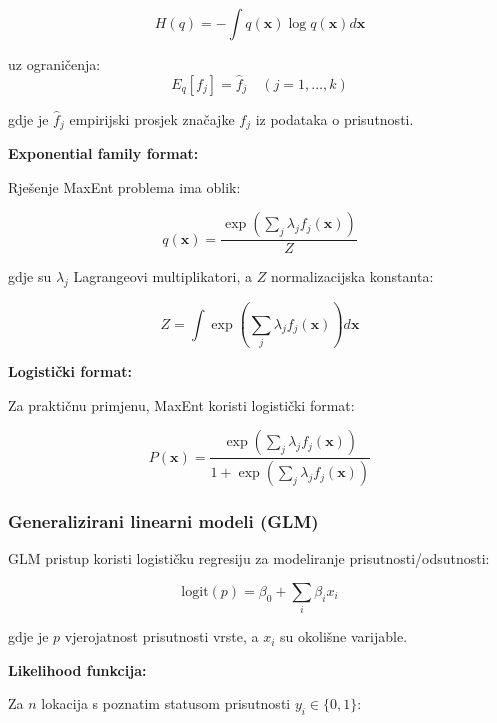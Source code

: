 \documentclass[11pt,oneside]{book}
\begin{document}
\begin{equation}
	H(q) = -\int q(\mathbf{x}) \log q(\mathbf{x}) d\mathbf{x}
\end{equation}

uz ograničenja:
\begin{equation}
	E_q[f_j] = \hat{f}_j \quad (j = 1, \ldots, k)
\end{equation}

gdje je $\hat{f}_j$ empirijski prosjek značajke $f_j$ iz podataka o prisutnosti.

\textbf{Exponential family format:}

Rješenje MaxEnt problema ima oblik:

\begin{equation}
	q(\mathbf{x}) = \frac{\exp\left(\sum_j \lambda_j f_j(\mathbf{x})\right)}{Z}
\end{equation}

gdje su $\lambda_j$ Lagrangeovi multiplikatori, a $Z$ normalizacijska konstanta:

\begin{equation}
	Z = \int \exp\left(\sum_j \lambda_j f_j(\mathbf{x})\right) d\mathbf{x}
\end{equation}

\textbf{Logistički format:}

Za praktičnu primjenu, MaxEnt koristi logistički format:

\begin{equation}
	P(\mathbf{x}) = \frac{\exp\left(\sum_j \lambda_j f_j(\mathbf{x})\right)}{1 + \exp\left(\sum_j \lambda_j f_j(\mathbf{x})\right)}
\end{equation}

\subsubsection{Generalizirani linearni modeli (GLM)}

GLM pristup koristi logističku regresiju za modeliranje prisutnosti/odsutnosti:

\begin{equation}
	\text{logit}(p) = \beta_0 + \sum_i \beta_i x_i
\end{equation}

gdje je $p$ vjerojatnost prisutnosti vrste, a $x_i$ su okolišne varijable.

\textbf{Likelihood funkcija:}

Za $n$ lokacija s poznatim statusom prisutnosti $y_i \in \{0,1\}$:
\end{document}
